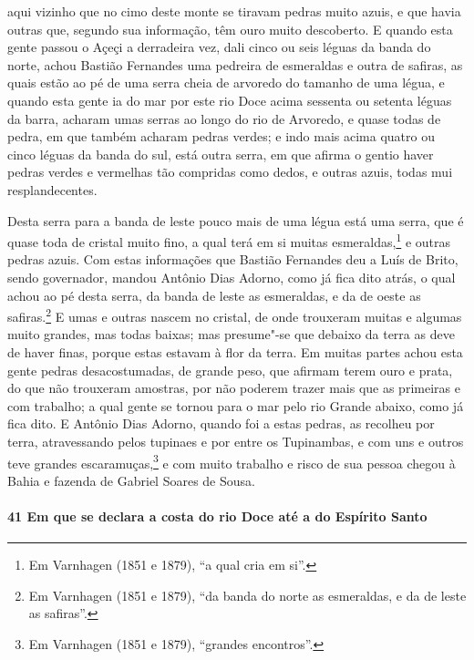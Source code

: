 aqui vizinho que no cimo deste monte se tiravam pedras muito azuis, e que havia outras
que, segundo sua informação, têm ouro muito descoberto. E quando esta gente passou o Açeçi
a derradeira vez, dali cinco ou seis léguas da banda do norte, achou Bastião Fernandes uma
pedreira de esmeraldas e outra de safiras, as quais estão ao pé de uma serra cheia de
arvoredo do tamanho de uma légua, e quando esta gente ia do mar por este rio Doce acima
sessenta ou setenta léguas da barra, acharam umas serras ao longo do rio de Arvoredo, e
quase todas de pedra, em que também acharam pedras verdes; e indo mais acima quatro ou
cinco léguas da banda do sul, está outra serra, em que afirma o gentio haver pedras verdes
e vermelhas tão compridas como dedos, e outras azuis, todas mui resplandecentes.

Desta serra para a banda de leste pouco mais de uma légua está uma serra, que é quase toda
de cristal muito fino, a qual terá em si muitas esmeraldas,\footnote{ Em Varnhagen (1851 e
1879), ``a qual cria em si''.} e outras pedras azuis. Com estas informações que Bastião
Fernandes deu a Luís de Brito, sendo governador, mandou Antônio Dias Adorno, como já fica
dito atrás, o qual achou ao pé desta serra, da banda de leste as esmeraldas, e da de oeste
as safiras.\footnote{ Em Varnhagen (1851 e 1879), ``da banda do norte as esmeraldas, e da
de leste as safiras''.} E umas e outras nascem no cristal, de onde trouxeram muitas e
algumas muito grandes, mas todas baixas; mas presume"-se que debaixo da terra as deve de
haver finas, porque estas estavam à flor da terra. Em muitas partes achou esta gente
pedras desacostumadas, de grande peso, que afirmam terem ouro e prata, do que não
trouxeram amostras, por não poderem trazer mais que as primeiras e com trabalho; a qual
gente se tornou para o mar pelo rio Grande abaixo, como já fica dito. E Antônio Dias
Adorno, quando foi a estas pedras, as recolheu por terra, atravessando pelos tupinaes e
por entre os Tupinambas, e com uns e outros teve grandes escaramuças,\footnote{ Em
Varnhagen (1851 e 1879), ``grandes encontros''.} e com muito trabalho e risco de sua
pessoa chegou à Bahia e fazenda de Gabriel Soares de Sousa.

\paragraph{41 Em que se declara a costa do rio Doce até a do Espírito Santo}

